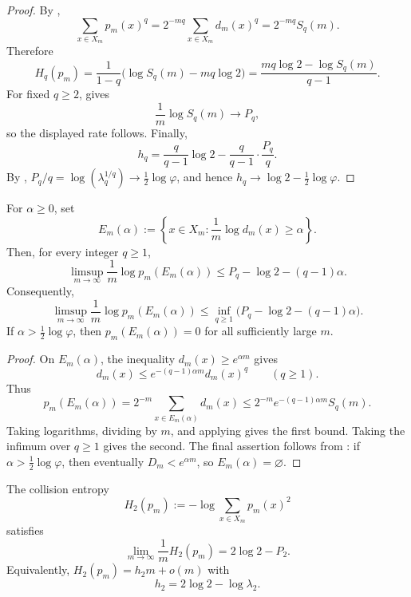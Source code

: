 \begin{proof}
By ,
\[
  \sum_{x\in X_m}p_m(x)^q
  =
  2^{-mq}\sum_{x\in X_m}d_m(x)^q
  =
  2^{-mq}S_q(m).
\]
Therefore
\[
  H_q(p_m)
  =
  \frac{1}{1-q}\bigl(\log S_q(m)-mq\log2\bigr)
  =
  \frac{mq\log2-\log S_q(m)}{q-1}.
\]
For fixed \(q\ge2\),  gives
\[
  \frac1m\log S_q(m)\to P_q,
\]
so the displayed rate follows.  Finally,
\[
  h_q
  =
  \frac{q}{q-1}\log2-\frac{q}{q-1}\cdot\frac{P_q}{q}.
\]
By , \(P_q/q=\log(\lambda_q^{1/q})\to
\frac12\log\varphi\), and hence \(h_q\to
\log2-\frac12\log\varphi\).
\end{proof}

\begin{corollary}
\label{cor:visible-thick-tail}
For \(\alpha\ge0\), set
\[
  E_m(\alpha):=
  \left\{x\in X_m:\frac1m\log d_m(x)\ge\alpha\right\}.
\]
Then, for every integer \(q\ge1\),
\[
  \limsup_{m\to\infty}\frac1m\log p_m(E_m(\alpha))
  \le
  P_q-\log2-(q-1)\alpha .
\]
Consequently,
\[
  \limsup_{m\to\infty}\frac1m\log p_m(E_m(\alpha))
  \le
  \inf_{q\ge1}\bigl(P_q-\log2-(q-1)\alpha\bigr).
\]
If \(\alpha>\frac12\log\varphi\), then \(p_m(E_m(\alpha))=0\) for all
sufficiently large \(m\).
\end{corollary}

\begin{proof}
On \(E_m(\alpha)\), the inequality \(d_m(x)\ge e^{\alpha m}\) gives
\[
  d_m(x)\le e^{-(q-1)\alpha m}d_m(x)^q
  \qquad(q\ge1).
\]
Thus
\[
  p_m(E_m(\alpha))
  =
  2^{-m}\sum_{x\in E_m(\alpha)}d_m(x)
  \le
  2^{-m}e^{-(q-1)\alpha m}S_q(m).
\]
Taking logarithms, dividing by \(m\), and applying
 gives the first bound.  Taking the infimum over
\(q\ge1\) gives the second.  The final assertion follows from
: if \(\alpha>\frac12\log\varphi\), then eventually
\(D_m<e^{\alpha m}\), so \(E_m(\alpha)=\varnothing\).
\end{proof}

\begin{corollary}
\label{thm:collision-entropy-rate}
The collision entropy
\[
  H_2(p_m):=-\log\sum_{x\in X_m}p_m(x)^2
\]
satisfies
\[
  \lim_{m\to\infty}\frac1mH_2(p_m)=2\log2-P_2.
\]
Equivalently, \(H_2(p_m)=h_2m+o(m)\) with
\[
  h_2=2\log2-\log\lambda_2.
\]
\end{corollary}

